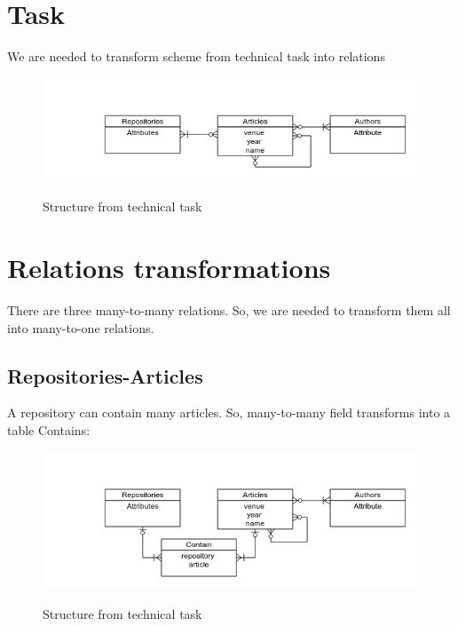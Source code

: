 \documentclass[12pt,a4paper]{article}
\begin{document}
\section{Task}
We are needed to transform scheme from technical task into relations
\begin{figure}[h!]
\includegraphics[scale=0.65791]{media/figure1.jpg}\\
\caption{Structure from technical task}
\end{figure}

\section{Relations transformations}
There are three many-to-many relations. So, we are needed to transform them all into many-to-one relations.
\subsection{Repositories-Articles}
A repository can contain many articles. So, many-to-many field transforms into a table Contains:\\
\begin{figure}[h!]
\includegraphics[scale=0.65791]{media/figure2.jpg}\\
\caption{Structure from technical task}
\end{figure}
\end{document}
